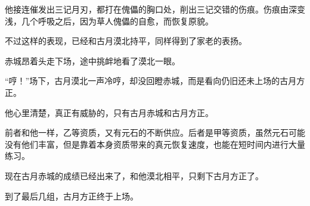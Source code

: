 \begin{this_body}
他接连催发出三记月刃，都打在傀儡的胸口处，削出三记交错的伤痕。伤痕由深变浅，几个呼吸之后，因为草人傀儡的自愈，而恢复原貌。

不过这样的表现，已经和古月漠北持平，同样得到了家老的表扬。

赤城昂着头走下场，途中挑衅地看了漠北一眼。

“哼！”场下，古月漠北一声冷哼，却没回瞪赤城，而是看向仍旧还未上场的古月方正。

他心里清楚，真正有威胁的，只有古月赤城和古月方正。

前者和他一样，乙等资质，又有元石的不断供应。后者是甲等资质，虽然元石可能没有他们丰富，但是靠着本身资质带来的真元恢复速度，也能在短时间内进行大量练习。

现在古月赤城的成绩已经出来了，和他漠北相平，只剩下古月方正了。

到了最后几组，古月方正终于上场。

\end{this_body}

